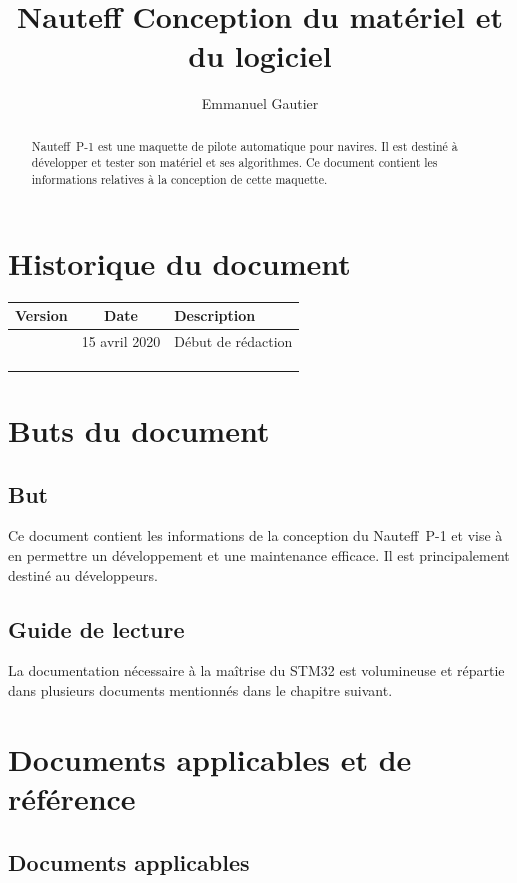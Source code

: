\documentclass[a4paper,11pt]{report}
\title{Nauteff Conception du matériel et du logiciel}
\author{Emmanuel Gautier}
\begin{document}
\maketitle

\begin{abstract}
Nauteff~P-1 est une maquette de pilote automatique pour navires.
Il est destiné à développer et tester son matériel et ses algorithmes.
Ce document contient les informations relatives à la conception
de cette maquette.
\end{abstract}
\chapter*{Historique du document}
\begin{tabular}{|c|c|l|}
	\hline 
	 Version & Date & Description \\ 
	\hline 
	  & 15 avril 2020 &  Début de rédaction \\ 
	  &  &  \\ 
	  &  &  \\ 
	  &  &  \\ 
	\hline 
\end{tabular}

\tableofcontents
\listoffigures

\chapter{Buts du document}
\section{But}
Ce document contient les informations de la conception du Nauteff~P-1 et vise à en permettre un développement et une maintenance efficace.
Il est principalement destiné au développeurs.

\section{Guide de lecture}

La documentation nécessaire à la maîtrise du STM32 est volumineuse et répartie
dans plusieurs documents mentionnés dans le chapitre suivant.

\chapter{Documents applicables et de référence}

\section{Documents applicables}
\printbibliography[keyword=APP, heading=none]
\printbibliography[keyword=REF, heading=none]
\end{document}
